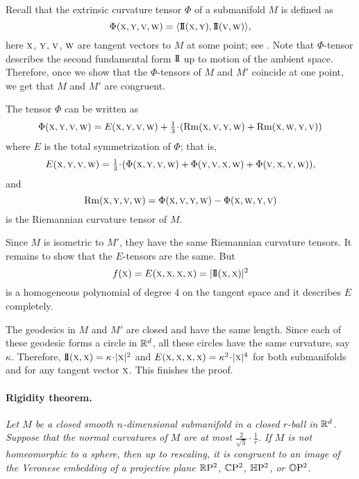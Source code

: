 \documentclass[a4paper,10pt]{article}
\begin{document}
Recall that the extrinsic curvature tensor $\Phi$ of a submanifold $M$ is defined as
\[\Phi({{\normalfont\textsc{x}}},{{\normalfont\textsc{y}}},{{\normalfont\textsc{v}}},{{\normalfont\textsc{w}}})=\langle \mathrm{I}\!\mathrm{I}({{\normalfont\textsc{x}}},{{\normalfont\textsc{y}}}),\mathrm{I}\!\mathrm{I}({{\normalfont\textsc{v}}},{{\normalfont\textsc{w}}})\rangle,\]
here ${\normalfont\textsc{x}}$, ${\normalfont\textsc{y}}$, ${\normalfont\textsc{v}}$, ${\normalfont\textsc{w}}$ are tangent vectors to $M$ at some point; 
see \cite{petrunin2003}.
Note that $\Phi$-tensor describes the second fundamental form $\mathrm{I}\!\mathrm{I}$ up to motion of the ambient space.
Therefore, once we show that the $\Phi$-tensors of $M$ and $M'$ coincide at one point,
we get that $M$ and $M'$ are congruent.

The tensor $\Phi$ can be written as
\[\Phi({\mathsc{x}},{\mathsc{y}},{\mathsc{v}},{\mathsc{w}})=E({\mathsc{x}},{\mathsc{y}},{\mathsc{v}},{\mathsc{w}})+\tfrac 1 3\cdot(\Rm({\mathsc{x}},{\mathsc{v}},{\mathsc{y}},{\mathsc{w}})+\Rm({\mathsc{x}},{\mathsc{w}},{\mathsc{y}},{\mathsc{v}}))\]
where $E$ is the total symmetrization of $\Phi$; that is,
$$E({\mathsc{x}},{\mathsc{y}},{\mathsc{v}},{\mathsc{w}})=\tfrac 1 3\cdot
(\Phi({\mathsc{x}},{\mathsc{y}},{\mathsc{v}},{\mathsc{w}})+\Phi({\mathsc{y}},{\mathsc{v}},{\mathsc{x}},{\mathsc{w}})+\Phi({\mathsc{v}},{\mathsc{x}},{\mathsc{y}},{\mathsc{w}})),$$
and
$$\operatorname{\rm Rm}({{\normalfont\textsc{x}}},{{\normalfont\textsc{y}}},{{\normalfont\textsc{v}}},{{\normalfont\textsc{w}}})=\Phi({{\normalfont\textsc{x}}},{{\normalfont\textsc{v}}},{{\normalfont\textsc{y}}},{{\normalfont\textsc{w}}})-\Phi({{\normalfont\textsc{x}}},{{\normalfont\textsc{w}}},{{\normalfont\textsc{y}}},{{\normalfont\textsc{v}}})$$
is the Riemannian curvature tensor of $M$.

Since $M$ is isometric to $M'$, they have the same Riemannian curvature tensors.
It remains to show that the $E$-tensors are the same.
But 
\[f({\mathsc{x}})=E({\mathsc{x}},{\mathsc{x}},{\mathsc{x}},{\mathsc{x}})\z=|\II({\mathsc{x}},{\mathsc{x}})|^2\]
is a homogeneous polynomial of degree $4$ on the tangent space 
and it describes $E$ completely.

The geodesics in $M$ and $M'$ are closed and have the same length.
Since each of these geodesic forms a circle in $\mathbb{R}^d$,
all these circles have the same curvature, say $\kappa$.
Therefore, $\II({\mathsc{x}},{\mathsc{x}})\z=\kappa\cdot|{\mathsc{x}}|^2$ and $E({\mathsc{x}},{\mathsc{x}},{\mathsc{x}},{\mathsc{x}})=\kappa^2\cdot|{\mathsc{x}}|^4$ 
for both submanifolds and for any tangent vector ${{\normalfont\textsc{x}}}$.
This finishes the proof.
\qeds


\paragraph{Rigidity theorem.}\label{thm:=}
\textit{Let $M$ be a closed smooth $n$-dimensional submanifold in a closed $r$-ball in $\mathbb{R}^d$.
Suppose that the normal curvatures of $M$ are at most $\tfrac2{\sqrt{3}}\cdot\tfrac1r$.
If $M$ is not homeomorphic to a sphere, then up to rescaling, it is congruent to an image of the Veronese embedding of a projective plane $\mathbb{R}\mathrm{P}^2$, $\mathbb{C}\mathrm{P}^2$, $\mathbb{H}\mathrm{P}^2$, or $\mathbb{O}\mathrm{P}^2$.}
\end{document}
